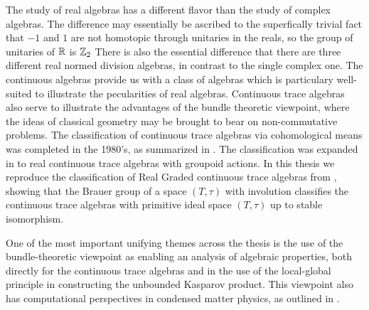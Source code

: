 The study of real \Cstar algebras has a different flavor than the study of complex \Cstar algebras. The difference may essentially be ascribed to the superfically trivial fact that $-1$ and $1$ are not homotopic through unitaries in the reals, so the group of unitaries of $\mathbb{R}$ is $\mathbb{Z}_2$ There is also the essential difference that there are three different real normed division algebras, in contrast to the single complex one. 
The continuous algebras provide us with a class of algebras which is particulary well-suited to illustrate the pecularities of real \Cstar algebras. Continuous trace algebras also serve to illustrate the advantages of the bundle theoretic viewpoint, where the ideas of classical geometry may be brought to bear on non-commutative problems. The classification of continuous trace algebras via cohomological means was completed in the 1980's, as summarized in \cite{raeburncont}. The classification was expanded in \cite{moutou} to real continuous trace algebras with groupoid actions. In this thesis we reproduce the classification of Real Graded continuous trace algebras from \cite{moutou}, showing that the Brauer group of a space $(T,\tau)$ with involution classifies the continuous trace algebras with primitive ideal space $(T,\tau)$ up to stable isomorphism.

One of the most important unifying themes across the thesis is the use of the bundle-theoretic viewpoint as enabling an analysis of \Cstar algebraic properties, both directly for the continuous trace algebras and in the use of the local-global principle in constructing the unbounded Kasparov product. This viewpoint also has computational perspectives in condensed matter physics, as outlined in \cite{prodan}.


